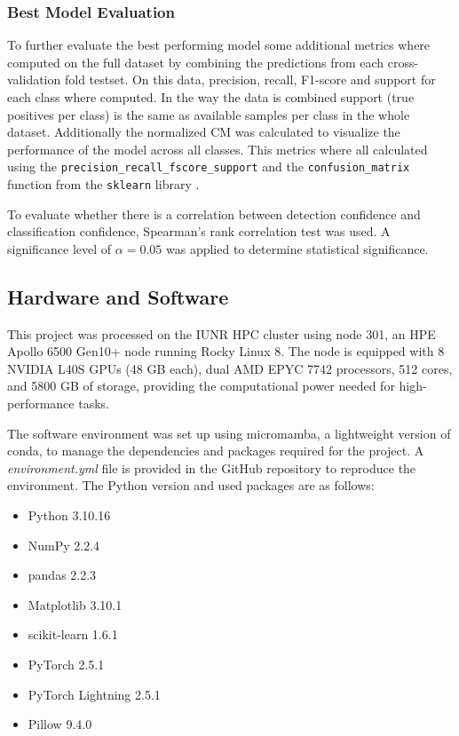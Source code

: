     \subsubsection{Best Model Evaluation}
    To further evaluate the best performing model some additional metrics where computed on the full dataset by combining the predictions from each cross-validation fold testset.
    On this data, precision, recall, F1-score and support for each class where computed.
    In the way the data is combined support (true positives per class) is the same as available samples per class in the whole dataset.
    Additionally the normalized \ac{CM} was calculated to visualize the performance of the model across all classes.
    This metrics where all calculated using the \texttt{precision\_recall\_fscore\_support} and the \texttt{confusion\_matrix} function from the \texttt{sklearn} library \autocite{pedregosaScikitlearnMachineLearning2011}.

    To evaluate whether there is a correlation between detection confidence and classification confidence, Spearman's rank correlation test was used. 
    A significance level of \( \alpha = 0.05 \) was applied to determine statistical significance.
    

    \subsection{Hardware and Software}

    This project was processed on the IUNR HPC cluster using node 301, an HPE Apollo 6500 Gen10+ node running Rocky Linux 8. 
    The node is equipped with 8 NVIDIA L40S GPUs (48 GB each), dual AMD EPYC 7742 processors, 512 cores, and 5800 GB of storage, providing the computational power needed for high-performance tasks.

    The software environment was set up using micromamba, a lightweight version of conda, to manage the dependencies and packages required for the project.
    A \textit{environment.yml} file is provided in the GitHub repository to reproduce the environment.
    The Python version and used packages are as follows:

    \begin{itemize}
        \item Python 3.10.16
        \item NumPy 2.2.4
        \item pandas 2.2.3
        \item Matplotlib 3.10.1
        \item scikit-learn 1.6.1
        \item PyTorch 2.5.1
        \item PyTorch Lightning 2.5.1
        \item Pillow 9.4.0
    \end{itemize}



